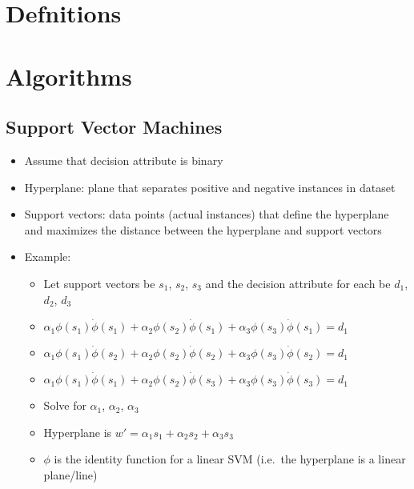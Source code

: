 \documentclass{article}
\begin{document}
\section{Defnitions}

\section{Algorithms}

\subsection{Support Vector Machines}
\begin{itemize}
	\item Assume that decision attribute is binary
	\item Hyperplane: plane that separates positive and negative instances in dataset
	\item Support vectors: data points (actual instances) that define the hyperplane and maximizes the distance between the hyperplane and support vectors
	\item Example:
		\begin{itemize}
			\item Let support vectors be $s_1$, $s_2$, $s_3$ and the decision attribute for each be $d_1$, $d_2$, $d_3$
			\item $\alpha_1 \phi(s_1) \dot \phi(s_1) + \alpha_2 \phi(s_2) \dot \phi(s_1) + \alpha_3 \phi(s_3) \dot \phi(s_1) = d_1$
			\item $\alpha_1 \phi(s_1) \dot \phi(s_2) + \alpha_2 \phi(s_2) \dot \phi(s_2) + \alpha_3 \phi(s_3) \dot \phi(s_2) = d_1$
			\item $\alpha_1 \phi(s_1) \dot \phi(s_1) + \alpha_2 \phi(s_2) \dot \phi(s_3) + \alpha_3 \phi(s_3) \dot \phi(s_3) = d_1$
			\item Solve for $\alpha_1$, $\alpha_2$, $\alpha_3$
			\item Hyperplane is $w' = \alpha_1 s_1 + \alpha_2 s_2 + \alpha_3 s_3$
			\item $\phi$ is the identity function for a linear SVM (i.e.\ the hyperplane is a linear plane/line)
			
		\end{itemize}
	\end{itemize}
\end{document}
